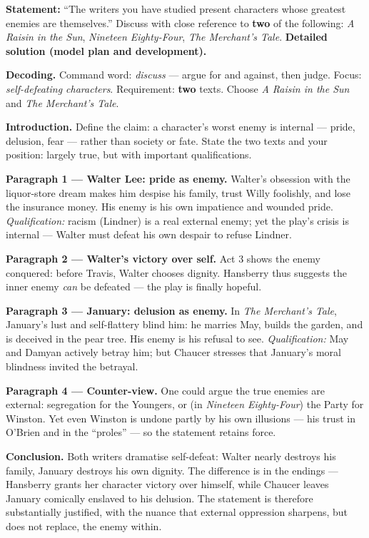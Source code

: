 \documentclass[11pt]{article}
\begin{document}
\begin{exoresolu}
\textbf{Statement:} ``The writers you have studied present characters whose greatest enemies are themselves.'' Discuss with close reference to \textbf{two} of the following: \emph{A Raisin in the Sun}, \emph{Nineteen Eighty-Four}, \emph{The Merchant's Tale}.
\tcblower
\textbf{Detailed solution (model plan and development).}

\textbf{Decoding.} Command word: \emph{discuss} — argue for and against, then judge. Focus: \emph{self-defeating characters}. Requirement: \textbf{two} texts. Choose \emph{A Raisin in the Sun} and \emph{The Merchant's Tale}.

\textbf{Introduction.} Define the claim: a character's worst enemy is internal — pride, delusion, fear — rather than society or fate. State the two texts and your position: largely true, but with important qualifications.

\textbf{Paragraph 1 — Walter Lee: pride as enemy.} Walter's obsession with the liquor-store dream makes him despise his family, trust Willy foolishly, and lose the insurance money. His enemy is his own impatience and wounded pride. \emph{Qualification:} racism (Lindner) is a real external enemy; yet the play's crisis is internal — Walter must defeat his own despair to refuse Lindner.

\textbf{Paragraph 2 — Walter's victory over self.} Act 3 shows the enemy conquered: before Travis, Walter chooses dignity. Hansberry thus suggests the inner enemy \emph{can} be defeated — the play is finally hopeful.

\textbf{Paragraph 3 — January: delusion as enemy.} In \emph{The Merchant's Tale}, January's lust and self-flattery blind him: he marries May, builds the garden, and is deceived in the pear tree. His enemy is his refusal to see. \emph{Qualification:} May and Damyan actively betray him; but Chaucer stresses that January's moral blindness invited the betrayal.

\textbf{Paragraph 4 — Counter-view.} One could argue the true enemies are external: segregation for the Youngers, or (in \emph{Nineteen Eighty-Four}) the Party for Winston. Yet even Winston is undone partly by his own illusions — his trust in O'Brien and in the ``proles'' — so the statement retains force.

\textbf{Conclusion.} Both writers dramatise self-defeat: Walter nearly destroys his family, January destroys his own dignity. The difference is in the endings — Hansberry grants her character victory over himself, while Chaucer leaves January comically enslaved to his delusion. The statement is therefore substantially justified, with the nuance that external oppression sharpens, but does not replace, the enemy within.
\end{exoresolu}
\end{document}
